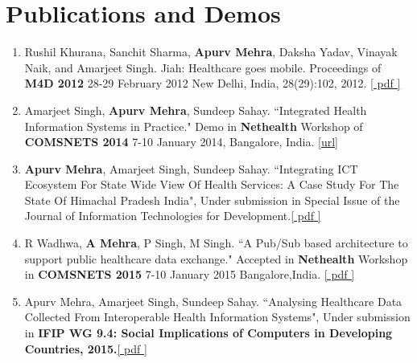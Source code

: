 \documentclass[a4paper,10pt]{article} %
\begin{document}
\newpage

\section{\color{red} Publications and Demos} %

\begin{enumerate}
	\item{ Rushil Khurana, Sanchit Sharma, \textbf{Apurv Mehra}, Daksha Yadav, Vinayak Naik, and Amarjeet
Singh. Jiah: Healthcare goes mobile. Proceedings of \textbf{ M4D 2012} 28-29 February 2012 New Delhi,
India, 28(29):102, 2012.} \href{http://kau.diva-portal.org/smash/get/diva2:472880/FULLTEXT01#page=119}{[ pdf ]}
	\item{Amarjeet Singh, \textbf{Apurv Mehra}, Sundeep Sahay. ``Integrated Health Information Systems in Practice." Demo in  \textbf{Nethealth} Workshop of \textbf{COMSNETS 2014} 7-10 January 2014,  Bangalore, India.} \href{http://www.comsnets.org/archive/2014/netHealth_workshop.html}{[url]}
	\item{\textbf{Apurv Mehra}, Amarjeet Singh, Sundeep Sahay. ``Integrating ICT Ecosystem For State Wide View Of Health Services: A Case Study For The State Of Himachal Pradesh India", Under submission in Special Issue of the Journal of Information Technologies for Development.}\href{https://dl.dropboxusercontent.com/u/56537440/papers/s1-ln185929431961667701-1939656818Hwf1861541021IdV97398269218592943PDF_HI0001.pdf}{[ pdf ]}
	\item{R Wadhwa, \textbf{A Mehra}, P Singh, M Singh. ``A Pub/Sub based architecture to support public
healthcare data exchange." Accepted in  \textbf{Nethealth} Workshop in \textbf{COMSNETS 2015} 7-10 January 2015 Bangalore,India.} \href{https://dl.dropboxusercontent.com/u/56537440/papers/pubsub.pdf}{[ pdf ]}
	\item{Apurv Mehra, Amarjeet Singh, Sundeep Sahay. ``Analysing Healthcare Data Collected  From 
Interoperable  Health  Information  Systems", Under submission in \textbf{IFIP WG 9.4: Social Implications of Computers in Developing Countries, 2015.}}\href{https://dl.dropboxusercontent.com/u/56537440/papers/Interoperablity_Model_Mehra_Apurv.pdf}{[ pdf ]}

\end{enumerate}
\end{document}
